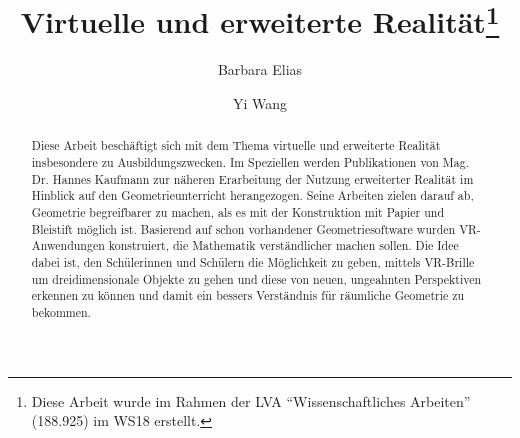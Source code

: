 \documentclass[deutsch]{llncs}
\begin{document}
\def\abstractname{Kurzfassung.}

\pagestyle{plain}

\title{Virtuelle und erweiterte Realität\thanks{Diese Arbeit wurde im Rahmen der LVA ``Wissenschaftliches Arbeiten'' (188.925) im WS18 erstellt.}}




\author{Barbara Elias \and Yi Wang}


\maketitle

\setcounter{footnote}{0}

\begin{abstract}
Diese Arbeit beschäftigt sich mit dem Thema virtuelle und erweiterte Realität insbesondere zu Ausbildungszwecken. Im Speziellen werden Publikationen von Mag. Dr. Hannes Kaufmann zur näheren Erarbeitung der Nutzung erweiterter Realität im Hinblick auf den Geometrieunterricht herangezogen. Seine Arbeiten zielen darauf ab, Geometrie begreifbarer zu machen, als es mit der Konstruktion mit Papier und Bleistift möglich ist. Basierend auf schon vorhandener Geometriesoftware wurden VR-Anwendungen konstruiert, die Mathematik verständlicher machen sollen. Die Idee dabei ist, den Schülerinnen und Schülern die Möglichkeit zu geben, mittels VR-Brille um dreidimensionale Objekte zu gehen und diese von neuen, ungeahnten Perspektiven erkennen zu können und damit ein bessers Verständnis für räumliche Geometrie zu bekommen.
\end{abstract}
\end{document}
